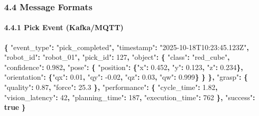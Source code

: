 \documentclass[
]{article}
\newenvironment{Shaded}{\begin{snugshade}}{\end{snugshade}}
\newcommand{\DataTypeTok}[1]{\textcolor[rgb]{0.13,0.29,0.53}{#1}}
\newcommand{\DecValTok}[1]{\textcolor[rgb]{0.00,0.00,0.81}{#1}}
\newcommand{\FloatTok}[1]{\textcolor[rgb]{0.00,0.00,0.81}{#1}}
\newcommand{\FunctionTok}[1]{\textcolor[rgb]{0.13,0.29,0.53}{\textbf{#1}}}
\newcommand{\KeywordTok}[1]{\textcolor[rgb]{0.13,0.29,0.53}{\textbf{#1}}}
\newcommand{\StringTok}[1]{\textcolor[rgb]{0.31,0.60,0.02}{#1}}
\begin{document}
\hypertarget{message-formats}{%
\subsubsection{4.4 Message Formats}\label{message-formats}}

\hypertarget{pick-event-kafkamqtt}{%
\paragraph{4.4.1 Pick Event (Kafka/MQTT)}\label{pick-event-kafkamqtt}}

\begin{Shaded}
\begin{Highlighting}[]
\FunctionTok{\{}
  \DataTypeTok{"event\_type"}\FunctionTok{:} \StringTok{"pick\_completed"}\FunctionTok{,}
  \DataTypeTok{"timestamp"}\FunctionTok{:} \StringTok{"2025{-}10{-}18T10:23:45.123Z"}\FunctionTok{,}
  \DataTypeTok{"robot\_id"}\FunctionTok{:} \StringTok{"robot\_01"}\FunctionTok{,}
  \DataTypeTok{"pick\_id"}\FunctionTok{:} \DecValTok{127}\FunctionTok{,}
  \DataTypeTok{"object"}\FunctionTok{:} \FunctionTok{\{}
    \DataTypeTok{"class"}\FunctionTok{:} \StringTok{"red\_cube"}\FunctionTok{,}
    \DataTypeTok{"confidence"}\FunctionTok{:} \FloatTok{0.982}\FunctionTok{,}
    \DataTypeTok{"pose"}\FunctionTok{:} \FunctionTok{\{}
      \DataTypeTok{"position"}\FunctionTok{:} \FunctionTok{\{}\DataTypeTok{"x"}\FunctionTok{:} \FloatTok{0.452}\FunctionTok{,} \DataTypeTok{"y"}\FunctionTok{:} \FloatTok{0.123}\FunctionTok{,} \DataTypeTok{"z"}\FunctionTok{:} \FloatTok{0.234}\FunctionTok{\},}
      \DataTypeTok{"orientation"}\FunctionTok{:} \FunctionTok{\{}\DataTypeTok{"qx"}\FunctionTok{:} \FloatTok{0.01}\FunctionTok{,} \DataTypeTok{"qy"}\FunctionTok{:} \FloatTok{{-}0.02}\FunctionTok{,} \DataTypeTok{"qz"}\FunctionTok{:} \FloatTok{0.03}\FunctionTok{,} \DataTypeTok{"qw"}\FunctionTok{:} \FloatTok{0.999}\FunctionTok{\}}
    \FunctionTok{\}}
  \FunctionTok{\},}
  \DataTypeTok{"grasp"}\FunctionTok{:} \FunctionTok{\{}
    \DataTypeTok{"quality"}\FunctionTok{:} \FloatTok{0.87}\FunctionTok{,}
    \DataTypeTok{"force"}\FunctionTok{:} \FloatTok{25.3}
  \FunctionTok{\},}
  \DataTypeTok{"performance"}\FunctionTok{:} \FunctionTok{\{}
    \DataTypeTok{"cycle\_time"}\FunctionTok{:} \FloatTok{1.82}\FunctionTok{,}
    \DataTypeTok{"vision\_latency"}\FunctionTok{:} \DecValTok{42}\FunctionTok{,}
    \DataTypeTok{"planning\_time"}\FunctionTok{:} \DecValTok{187}\FunctionTok{,}
    \DataTypeTok{"execution\_time"}\FunctionTok{:} \DecValTok{762}
  \FunctionTok{\},}
  \DataTypeTok{"success"}\FunctionTok{:} \KeywordTok{true}
\FunctionTok{\}}
\end{Highlighting}
\end{Shaded}
\end{document}
